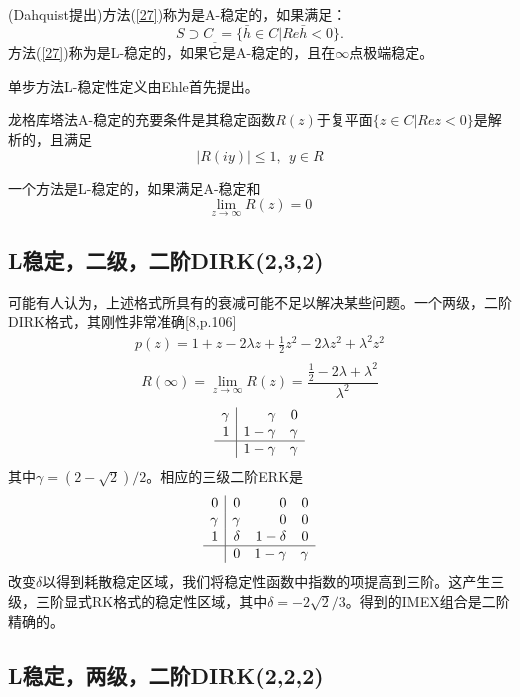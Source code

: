 \documentclass[12pt,a4paper]{article}
\numberwithin{equation}{section}
\begin{document}
(Dahquist提出)方法(\ref{27})称为是A-稳定的，如果满足：
\begin{equation*}
S\supset C_{\_}=\{\bar{h}\in C|Re\bar{h}<0\}.
\end{equation*}
方法(\ref{27})称为是L-稳定的，如果它是A-稳定的，且在$\infty$点极端稳定。

单步方法L-稳定性定义由Ehle首先提出。

龙格库塔法A-稳定的充要条件是其稳定函数$R(z)$于复平面$\{z\in C|Rez<0\}$是解析的，且满足
\begin{equation}
|R(iy)|\le 1,~~y\in R
\end{equation}

一个方法是L-稳定的，如果满足A-稳定和
\begin{equation*}
\lim\limits_{z\to\infty}R(z)=0
\end{equation*}
\subsection{L稳定，二级，二阶DIRK(2,3,2)}

可能有人认为，上述格式所具有的衰减可能不足以解决某些问题。一个两级，二阶DIRK格式，其刚性非常准确[8,p.106]
\begin{gather*}
p(z)=1+z-2\lambda z+\frac{1}{2}z^2-2\lambda z^2+\lambda^2z^2\\
\end{gather*}
\begin{equation*}
R(\infty)=\lim\limits_{z\to \infty}R(z)=\frac{\frac{1}{2}-2\lambda+\lambda^2}{\lambda^2}
\end{equation*}
\[
\begin{array}{r|rr}
\gamma & \gamma & 0\\1 & 1-\gamma & \gamma\\
\hline
& 1-\gamma & \gamma
\end{array}
\]
其中$\gamma=(2-\sqrt{2})/2$。相应的三级二阶ERK是
\[
\begin{array}{r|rrr}
0 & 0 & 0 & 0\\
\gamma & \gamma & 0 & 0 \\
1 & \delta& 1-\delta & 0\\
\hline
& 0 & 1-\gamma & \gamma
\end{array}
\]
改变$\delta$以得到耗散稳定区域，我们将稳定性函数中指数的项提高到三阶。这产生三级，三阶显式RK格式的稳定性区域，其中$\delta=-2\sqrt{2}/3$。得到的IMEX组合是二阶精确的。

\subsection{L稳定，两级，二阶DIRK(2,2,2)}
\end{document}
